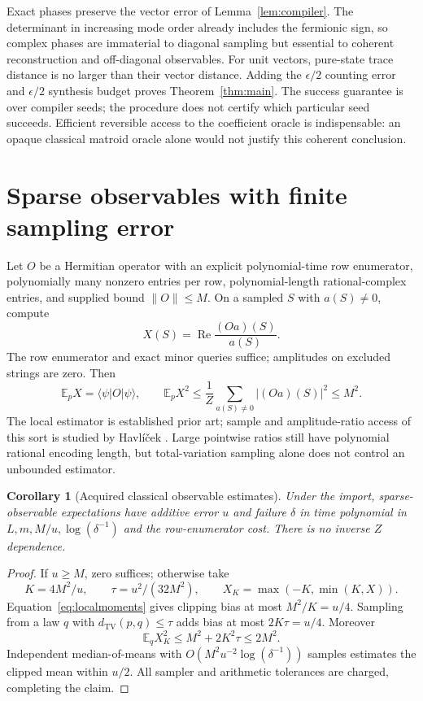 \documentclass[11pt]{article}
\newtheorem{corollary}[theorem]{Corollary}
\theoremstyle{remark}
\newcommand{\E}{\mathbb E}
\newcommand{\TV}{d_{\mathrm{TV}}}
\newcommand{\ket}[1]{\lvert #1\rangle}
\newcommand{\bra}[1]{\langle #1\rvert}
\begin{document}
Exact phases preserve the vector error of Lemma~\ref{lem:compiler}. The determinant in increasing mode order already includes the fermionic sign, so complex phases are immaterial to diagonal sampling but essential to coherent reconstruction and off-diagonal observables. For unit vectors, pure-state trace distance is no larger than their vector distance. Adding the $\epsilon/2$ counting error and $\epsilon/2$ synthesis budget proves Theorem~\ref{thm:main}. The success guarantee is over compiler seeds; the procedure does not certify which particular seed succeeds. Efficient reversible access to the coefficient oracle is indispensable: an opaque classical matroid oracle alone would not justify this coherent conclusion.

\section{Sparse observables with finite sampling error}
Let $O$ be a Hermitian operator with an explicit polynomial-time row enumerator, polynomially many nonzero entries per row, polynomial-length rational-complex entries, and supplied bound $\|O\|\le M$. On a sampled $S$ with $a(S)\ne0$, compute
\[
 X(S)=\operatorname{Re}\frac{(Oa)(S)}{a(S)}.
\]
The row enumerator and exact minor queries suffice; amplitudes on excluded strings are zero. Then
\begin{equation}\label{eq:localmoments}
 \E_pX=\bra\psi O\ket\psi,\qquad
 \E_pX^2\le\frac1Z\sum_{a(S)\ne0}|(Oa)(S)|^2\le M^2.
\end{equation}
The local estimator is established prior art; sample and amplitude-ratio access of this sort is studied by Havl\'{i}\v{c}ek \cite{Hav}. Large pointwise ratios still have polynomial rational encoding length, but total-variation sampling alone does not control an unbounded estimator.

\begin{corollary}[Acquired classical observable estimates]\label{cor:observable}
Under the import, sparse-observable expectations have additive error $u$ and failure $\delta$ in time polynomial in $L,m,M/u,\log(\delta^{-1})$ and the row-enumerator cost. There is no inverse $Z$ dependence.
\end{corollary}
\begin{proof}
If $u\ge M$, zero suffices; otherwise take
\[
 K=4M^2/u,\qquad \tau=u^2/(32M^2),\qquad
 X_K=\max(-K,\min(K,X)).
\]
Equation~\eqref{eq:localmoments} gives clipping bias at most $M^2/K=u/4$. Sampling from a law $q$ with $\TV(p,q)\le\tau$ adds bias at most $2K\tau=u/4$. Moreover
\[
 \E_qX_K^2\le M^2+2K^2\tau\le2M^2.
\]
Independent median-of-means with $O(M^2u^{-2}\log(\delta^{-1}))$ samples estimates the clipped mean within $u/2$. All sampler and arithmetic tolerances are charged, completing the claim.
\end{proof}
\end{document}
